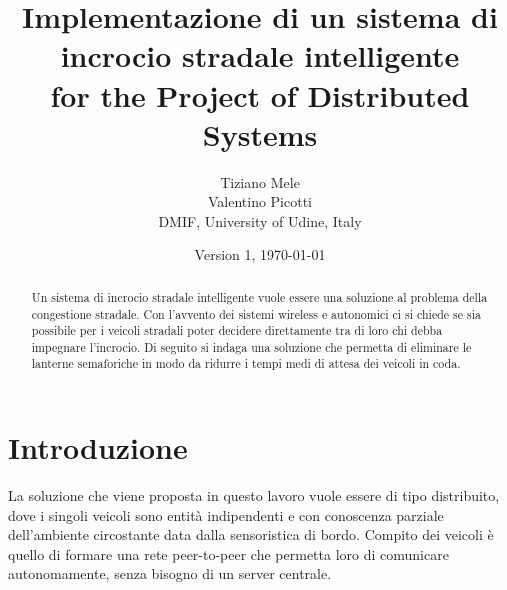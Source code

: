 \documentclass{memoir}
\title{Implementazione di un sistema di incrocio stradale intelligente \\ for the Project of Distributed Systems}
\author{Tiziano Mele\\Valentino Picotti\\DMIF, University of Udine, Italy}
\date{Version 1, \today}
\begin{document}
\maketitle
\begin{abstract}
  Un sistema di incrocio stradale intelligente vuole essere una soluzione al
  problema della congestione stradale. Con l'avvento dei sistemi wireless e
  autonomici ci si chiede se sia possibile per i veicoli stradali poter decidere
  direttamente tra di loro chi debba impegnare l'incrocio. Di seguito si indaga
  una soluzione che permetta di eliminare le lanterne semaforiche in modo da
  ridurre i tempi medi di attesa dei veicoli in coda.
\end{abstract}

\chapter{Introduzione}\label{ch:intro}

La soluzione che viene proposta in questo lavoro vuole essere di tipo
distribuito, dove i singoli veicoli sono entità indipendenti e con conoscenza
parziale dell'ambiente circostante data dalla sensoristica di bordo. Compito dei
veicoli è quello di formare una rete peer-to-peer che permetta loro di
comunicare autonomamente, senza bisogno di un server centrale.

\end{document}
